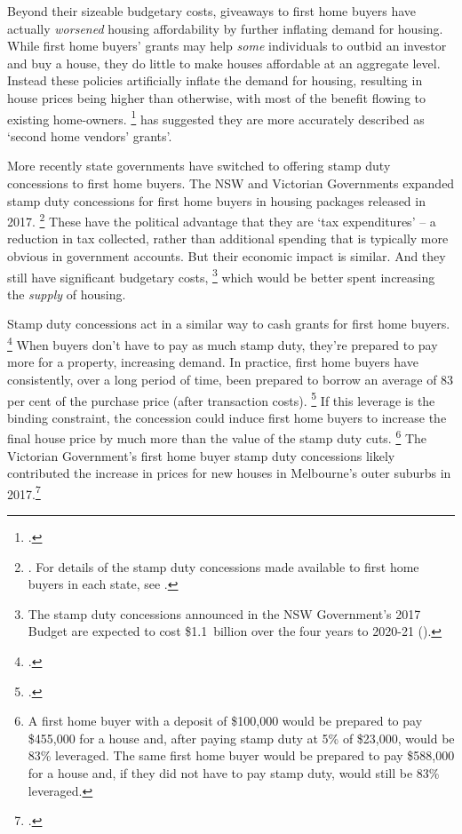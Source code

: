 Beyond their sizeable budgetary costs, giveaways to first home buyers have actually \emph{worsened} housing affordability by further inflating demand for housing.
While first home buyers' grants may help \emph{some} individuals to outbid an investor and buy a house, they do little to make houses affordable at an aggregate level.
Instead these policies artificially inflate the demand for housing, resulting in house prices being higher than otherwise, with most of the benefit flowing to existing home-owners.%
	\footcite{COAG-2012-Housing-supply-affordability-reform}
\textcite{Eslake2013} has suggested they are more accurately described as `second home vendors' grants'.

More recently state governments have switched to offering stamp duty concessions to first home buyers.
The NSW and Victorian Governments expanded stamp duty concessions for first home buyers in housing packages released in 2017.%
	\footnote{\textcites{VicStateGov2017Homes}{NSWGovFirstHome2017}.
For details of the stamp duty concessions made available to first home buyers in each state, see \textcite[][18--21]{NSW-Treasury-2016-Interstate-comparison-taxes-201516}.}
These have the political advantage that they are `tax expenditures' -- a reduction in tax collected, rather than additional spending that is typically more obvious in government accounts.
But their economic impact is similar.
And they still have significant budgetary costs,%
	\footnote{The stamp duty concessions announced in the NSW Government's 2017 Budget are expected to cost \$1.1~billion over the four years to 2020-21 (\textcite{NSW-Budget-2017-18-BS1}).}
which would be better spent increasing the \emph{supply} of housing.

Stamp duty concessions act in a similar way to cash grants for first home buyers.%
	\footcite{Davidoff-Leigh-2013-How-do-stamp-duties-affect-the-housing-market}
When buyers don't have to pay as much stamp duty, they're prepared to pay more for a property, increasing demand.
In practice, first home buyers have consistently, over a long period of time, been prepared to borrow an average of 83 per cent of the purchase price (after transaction costs).%
	\footcite[][13]{Simon-Stone-2017-Property-Ladder}
If this leverage is the binding constraint, the concession could induce first home buyers to increase the final house price by much more than the value of the stamp duty cuts.%
	\footnote{A first home buyer with a deposit of \$100,000 would be prepared to pay \$455,000 for a house and, after paying stamp duty at 5\% of \$23,000, would be 83\% leveraged.
	The same first home buyer would be prepared to pay \$588,000 for a house and, if they did not have to pay stamp duty, would still be 83\% leveraged.}
The Victorian Government's first home buyer stamp duty concessions likely contributed the increase in prices for new houses in Melbourne's outer suburbs in 2017.\footcites{Worrall_fhb_vic_2018_domain}{Schlesinger_AFR_2017_Melb_price_surge}{Lenaghan_AFR_2017_Melb_stamp_duty}

